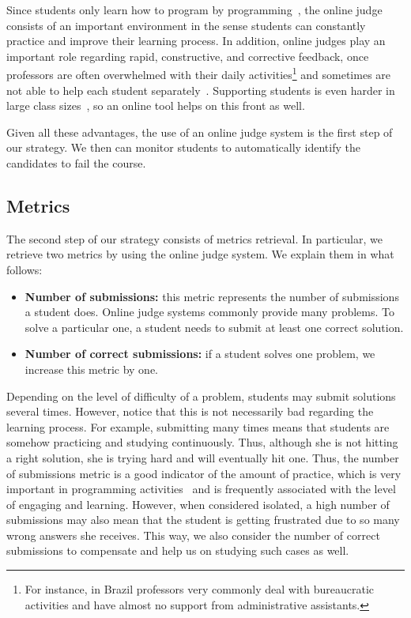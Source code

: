 Since students only learn how to program by programming~\cite{jenkins-ltsn02}, the online judge consists of an important environment in the sense students can constantly practice and improve their learning process. In addition, online judges play an important role regarding rapid, constructive, and corrective feedback, once professors are often overwhelmed with their daily activities\footnote{For instance, in Brazil professors very commonly deal with bureaucratic activities and have almost no support from administrative assistants.} and sometimes are not able to help each student separately~\cite{autolep-2011}. Supporting students is even harder in large class sizes~\cite{autolep-2011}, so an online tool helps on this front as well.


Given all these advantages, the use of an online judge system is the first step of our strategy. We then can monitor students to automatically identify the candidates to fail the course.

\subsection{Metrics}

\label{sec:metrics}

The second step of our strategy consists of metrics retrieval. In particular, we retrieve two metrics by using the online judge system. We explain them in what follows:

\begin{itemize}

	\item \textbf{Number of submissions:} this metric represents the number of submissions a student does. Online judge systems commonly provide many problems. To solve a particular one, a student needs to submit at least one correct solution.

	\item \textbf{Number of correct submissions:} if a student solves one problem, we increase this metric by one.

\end{itemize}

Depending on the level of difficulty of a problem, students may submit solutions several times. However, notice that this is not necessarily bad regarding the learning process. For example, submitting many times means that students are somehow practicing and studying continuously. Thus, although she is not hitting a right solution, she is trying hard and will eventually hit one. Thus, the number of submissions metric is a good indicator of the amount of practice, which is very important in programming activities~\cite{cheang-online-judge-2003} and is frequently associated with the level of engaging and learning. However, when considered isolated, a high number of submissions may also mean that the student is getting frustrated due to so many wrong answers she receives. This way, we also consider the number of correct submissions to compensate and help us on studying such cases as well.

